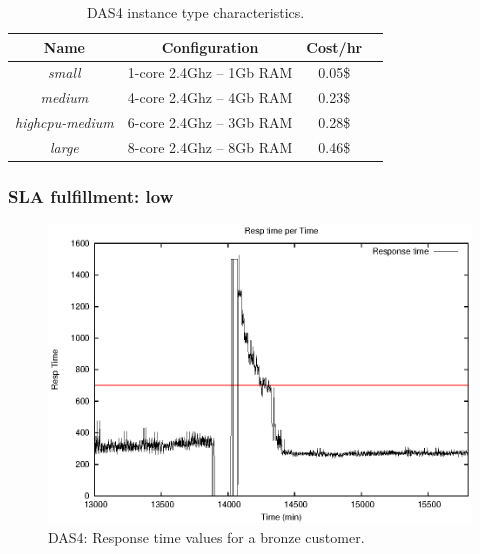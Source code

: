 \begin{table}\label{DAS4instances}
  {\scriptsize 
\begin{center}
    \begin{tabular}{  | c | c | c | c | }
    \hline
       \textbf{Name}  & \textbf{Configuration} & \textbf{Cost/hr} \\ \hline
   \textit{small}   & 1-core 2.4Ghz -- 1Gb RAM&  0.05\$ \\ \hline
   \textit{medium}   & 4-core 2.4Ghz  -- 4Gb RAM&  0.23\$ \\ \hline
\textit{highcpu-medium} & 6-core 2.4Ghz -- 3Gb RAM& 0.28\$   \\ \hline
\textit{large} & 8-core 2.4Ghz  -- 8Gb RAM& 0.46\$   \\ \hline

 \end{tabular}
\end{center}
\vspace{-5mm}
\caption{DAS4 instance type characteristics.}
\label{DAS4instances}
}
\end{table}


\subsubsection{SLA fulfillment: low}

\begin{figure}
  \begin{center}
    \includegraphics[width=.85\linewidth]{images/exps2011/low/das/proxyDataPoints_output_filtered.eps}
  \end{center}
\vspace{-5mm}
  \caption{DAS4: Response time values for a bronze customer.}
  \label{lowResponseTime}
\end{figure}



